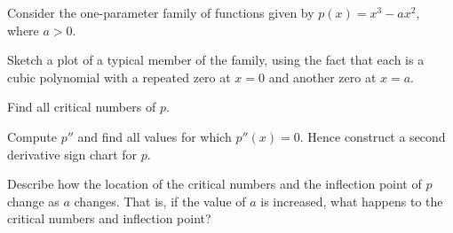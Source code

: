 \begin{exercises} 
\item Consider the one-parameter family of functions given by $p(x) = x^3-ax^2$, where $a>0$.
\ba
	\item Sketch a plot of a typical member of the family, using the fact that each is a cubic polynomial with a repeated zero at $x = 0$ and another zero at $x = a$.
	\item Find all critical numbers of $p$.
	\item Compute $p''$ and find all values for which $p''(x) = 0$.  Hence construct a second derivative sign chart for $p$.
	\item Describe how the location of the critical numbers and the inflection point of $p$ change as $a$ changes.  That is, if the value of $a$ is increased, what happens to the critical numbers and inflection point?
\ea


\end{exercises}
